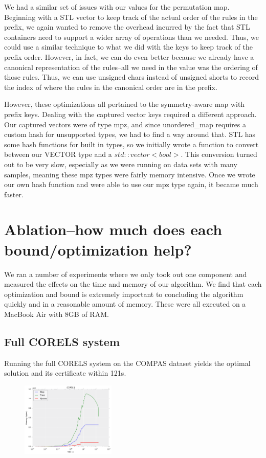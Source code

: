 We had a similar set of issues with our values for the permutation map.
Beginning with a STL vector to keep track of the actual order of the rules in the prefix, we again wanted to remove the overhead incurred by the fact that STL containers need to support a wider array of operations than we needed.
Thus, we could use a similar technique to what we did with the keys to keep track of the prefix order.
However, in fact, we can do even better because we already have a canonical representation of the rules--all we need in the value was the ordering of those rules.
Thus, we can use unsigned chars instead of unsigned shorts to record the index of where the rules in the canonical order are in the prefix.

However, these optimizations all pertained to the symmetry-aware map with prefix keys.
Dealing with the captured vector keys required a different approach.
Our captured vectors were of type mpz, and since unordered\_map requires a custom hash for unsupported types, we had to find a way around that.
STL has some hash functions for built in types, so we initially wrote a function to convert between our VECTOR type and a $std::vector<bool>$.
This conversion turned out to be very slow, especially as we were running on data sets with many samples, meaning these mpz types were fairly memory intensive.
Once we wrote our own hash function and were able to use our mpz type again, it became much faster.

\section{Ablation--how much does each bound/optimization help?}

We ran a number of experiments where we only took out one component and measured the effects on the time and memory of our algorithm.
We find that each optimization and bound is extremely important to concluding the algorithm quickly and in a reasonable amount of memory.
These were all executed on a MacBook Air with 8GB of RAM.

\subsection{Full CORELS system}

Running the full CORELS system on the COMPAS dataset yields the optimal solution and its certificate within 121s.

\begin{figure}[t!]
\begin{center}
\includegraphics[width=0.4\textwidth]{figs/corels_mem.png}
\end{center}
\caption{}
\label{fig:prefix-captured}
\end{figure}

